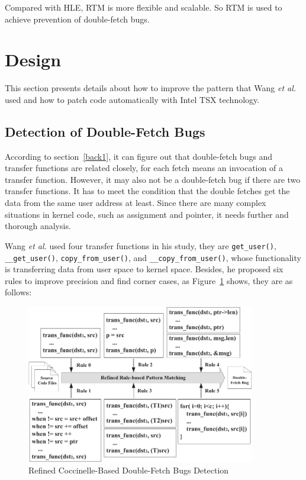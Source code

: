 \documentclass[10pt]{llncs}
\begin{document}
Compared with HLE, RTM is more flexible and scalable. So RTM is used to achieve prevention of double-fetch bugs. 
\section{Design}%
\label{design}

This section presents details about how to improve the pattern that Wang \textit{et al.} used and how to patch code automatically with Intel TSX technology.
\subsection{Detection of Double-Fetch Bugs}
\label{design1}
According to section~\ref{back1}, it can figure out that double-fetch bugs and transfer functions are related closely, for each fetch means an invocation of a transfer function. However, it may also not be a double-fetch bug if there are two transfer functions. It has to meet the condition that the double fetches get the data from the same user address at least. Since there are many complex situations in kernel code, such as assignment and pointer, it needs further and thorough analysis.

Wang \textit{et al.} used four transfer functions in his study, they are \verb:get_user():, \verb:__get_user():, \verb:copy_from_user():, and \verb:__copy_from_user():, whose functionality is transferring data from user space to kernel space. Besides, he proposed six rules to improve precision and find corner cases, as Figure~\ref{Cocci} shows, they are as follows:

\begin{figure}
  \centering
  \includegraphics[width=10cm]{refined}
  \caption{Refined Coccinelle-Based Double-Fetch Bugs Detection~\cite{wang}}
  \label{Cocci}
\end{figure}
\end{document}
